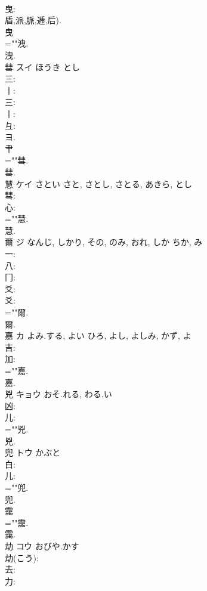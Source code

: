 \documentclass[8pt]{extreport}
\begin{document}
\begin{CJK}{UTF8}{min}
\\	曳: 
\\	盾,派,脈,逓,后). 
\\	曳 
\\	=""洩.
\\	洩.
\\	彗	スイ	ほうき	とし	
\\	三: 
\\	丨: 
\\	三: 
\\	丨: 
\\	彑: 
\\	ヨ. 
\\	肀 
\\	=""彗.
\\	彗.
\\	慧	ケイ	さとい	さと, さとし, さとる, あきら, とし	
\\	彗: 
\\	心: 
\\	=""慧.
\\	慧.
\\	爾	ジ	なんじ, しかり, その, のみ, おれ, しか	ちか, み	
\\	一: 
\\	八: 
\\	冂: 
\\	爻: 
\\	爻: 
\\	=""爾.
\\	爾.
\\	嘉	カ	よみ.する, よい	ひろ, よし, よしみ, かず, よ	
\\	吉: 
\\	加: 
\\	=""嘉.
\\	嘉.
\\	兇	キョウ	おそ.れる, わる.い		
\\	凶: 
\\	儿: 
\\	=""兇.
\\	兇.
\\	兜	トウ	かぶと		
\\	白: 
\\	儿: 
\\	=""兜.
\\	兜.
\\	靄						
\\	=""靄.
\\	靄.
\\	劫	コウ	おびや.かす		
\\	劫(こう): 
\\	去: 
\\	力: 

\end{CJK}
\end{document}
